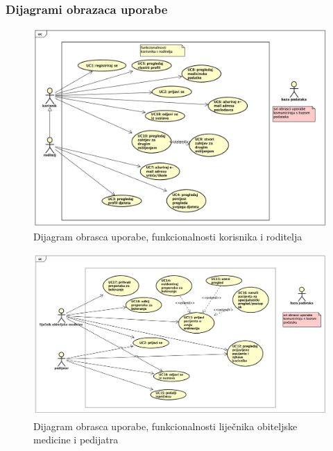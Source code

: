     
				\subsubsection{Dijagrami obrazaca uporabe}
					
					\begin{figure}[H]
						\includegraphics[width=\textwidth]{slike/uc_korisnik.png} 
						\caption{Dijagram obrasca uporabe, funkcionalnosti korisnika i roditelja}
					\end{figure}
					\begin{figure}[H]
						\includegraphics[width=\textwidth]{slike/uc_dr.png} 
						\caption{Dijagram obrasca uporabe, funkcionalnosti liječnika obiteljske medicine i pedijatra}
					\end{figure}
